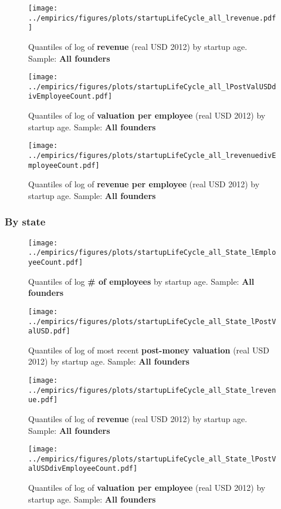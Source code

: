 \documentclass[12pt,english]{article}
\theoremstyle{remark}
\let\Oldsubsubsection\subsubsection
\renewcommand{\subsubsection}{\FloatBarrier\Oldsubsubsection}
\begin{document}
\begin{figure}[!htb]
	\centering
	\texttt{[image: ../empirics/figures/plots/startupLifeCycle\_all\_lrevenue.pdf]}
	\caption{Quantiles of log of \textbf{revenue} (real USD 2012) by startup age. 
		Sample: \textbf{All founders}}
\end{figure}

\begin{figure}[!htb]
	\centering
	\texttt{[image: ../empirics/figures/plots/startupLifeCycle\_all\_lPostValUSDdivEmployeeCount.pdf]}
	\caption{Quantiles of log of \textbf{valuation per employee} (real USD 2012) by startup age. 
		Sample: \textbf{All founders}}
\end{figure}

\begin{figure}[!htb]
	\centering
	\texttt{[image: ../empirics/figures/plots/startupLifeCycle\_all\_lrevenuedivEmployeeCount.pdf]}
	\caption{Quantiles of log of \textbf{revenue per employee} (real USD 2012) by startup age. 
		Sample: \textbf{All founders}}
\end{figure}

\subsubsection{By state}

\begin{figure}[!htb]
	\centering
	\texttt{[image: ../empirics/figures/plots/startupLifeCycle\_all\_State\_lEmployeeCount.pdf]}
	\caption{Quantiles of log \textbf{\# of employees} by startup age. 
		Sample: \textbf{All founders}}
\end{figure}

\begin{figure}[!htb]
	\centering
	\texttt{[image: ../empirics/figures/plots/startupLifeCycle\_all\_State\_lPostValUSD.pdf]}
	\caption{Quantiles of log of most recent \textbf{post-money valuation} (real USD 2012) by startup age. 
		Sample: \textbf{All founders}}
\end{figure}

\begin{figure}[!htb]
	\centering
	\texttt{[image: ../empirics/figures/plots/startupLifeCycle\_all\_State\_lrevenue.pdf]}
	\caption{Quantiles of log of \textbf{revenue} (real USD 2012) by startup age. 
		Sample: \textbf{All founders}}
\end{figure}

\begin{figure}[!htb]
	\centering
	\texttt{[image: ../empirics/figures/plots/startupLifeCycle\_all\_State\_lPostValUSDdivEmployeeCount.pdf]}
	\caption{Quantiles of log of \textbf{valuation per employee} (real USD 2012) by startup age. 
		Sample: \textbf{All founders}}
\end{figure}
\end{document}

